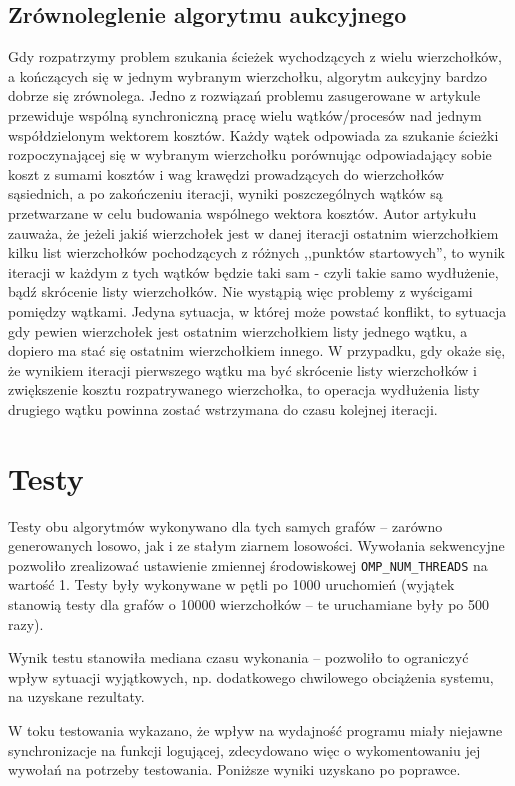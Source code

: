 \documentclass {article}
\begin{document}
\subsection{Zrównoleglenie algorytmu aukcyjnego}

Gdy rozpatrzymy problem szukania ścieżek wychodzących z wielu wierzchołków, a kończących się w jednym wybranym wierzchołku, algorytm aukcyjny bardzo dobrze się zrównolega. Jedno z rozwiązań problemu zasugerowane w artykule \cite{Bertsekas1991} przewiduje wspólną synchroniczną pracę wielu wątków/procesów nad jednym współdzielonym wektorem kosztów. Każdy wątek odpowiada za szukanie ścieżki rozpoczynającej się w wybranym wierzchołku porównując odpowiadający sobie koszt z sumami kosztów i wag krawędzi prowadzących do wierzchołków sąsiednich, a po zakończeniu iteracji, wyniki poszczególnych wątków są przetwarzane w celu budowania wspólnego wektora kosztów. Autor artykułu zauważa, że jeżeli jakiś wierzchołek jest w danej iteracji ostatnim wierzchołkiem kilku list wierzchołków pochodzących z różnych ,,punktów startowych'', to wynik iteracji w każdym z tych wątków będzie taki sam - czyli takie samo wydłużenie, bądź skrócenie listy wierzchołków. Nie wystąpią więc problemy z wyścigami pomiędzy wątkami. Jedyna sytuacja, w której może powstać konflikt, to sytuacja gdy pewien wierzchołek jest ostatnim wierzchołkiem listy jednego wątku, a dopiero ma stać się ostatnim wierzchołkiem innego. W przypadku, gdy okaże się, że wynikiem iteracji pierwszego wątku ma być skrócenie listy wierzchołków i zwiększenie kosztu rozpatrywanego wierzchołka, to operacja wydłużenia listy drugiego wątku powinna zostać wstrzymana do czasu kolejnej iteracji.

\section{Testy}

Testy obu algorytmów wykonywano dla tych samych grafów -- zarówno generowanych losowo, jak i ze stałym ziarnem losowości. Wywołania sekwencyjne pozwoliło zrealizować ustawienie zmiennej środowiskowej \verb|OMP_NUM_THREADS| na wartość 1. Testy były wykonywane w pętli po 1000 uruchomień (wyjątek stanowią testy dla grafów o 10000 wierzchołków -- te uruchamiane były po 500 razy).

Wynik testu stanowiła mediana czasu wykonania -- pozwoliło to ograniczyć wpływ sytuacji wyjątkowych, np. dodatkowego chwilowego obciążenia systemu, na uzyskane rezultaty.

W toku testowania wykazano, że wpływ na wydajność programu miały niejawne synchronizacje na funkcji logującej, zdecydowano więc o wykomentowaniu jej wywołań na potrzeby testowania. Poniższe wyniki uzyskano po poprawce.
\end{document}
